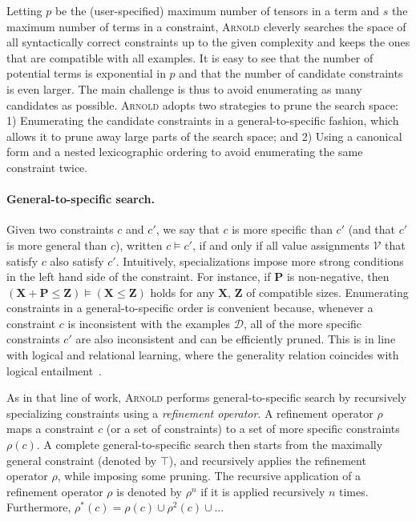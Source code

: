 \documentclass{article}
\newcommand{\luc}[1]{{\bf \textcolor{red}{{Luc: #1}}}}
\newcommand{\learner}{\textsc{Arnold}\xspace}
\newcommand{\dataset}{\ensuremath{\mathcal{D}}\xspace}
\newcommand{\variables}{\ensuremath{\mathcal{V}}\xspace}
\renewcommand\[{\begin{equation}}
\renewcommand\]{\end{equation}}
\newcommand{\TP}{\textbf{P}\xspace}
\newcommand{\TX}{\textbf{X}\xspace}
\newcommand{\TZ}{\textbf{Z}\xspace}
\begin{document}
Letting $p$ be the (user-specified) maximum number of tensors in a term and $s$
the maximum number of terms in a constraint, \learner cleverly searches the
space of all syntactically correct constraints up to the given complexity and
keeps the ones that are compatible with all examples.  It is easy to see that
the number of potential terms is exponential in $p$ and that the number of
candidate constraints is even larger.  The main challenge is thus to avoid
enumerating as many candidates as possible.
%
\learner adopts two strategies to prune the search space:
%
1) Enumerating the candidate constraints in a general-to-specific fashion,
which allows it to prune away large parts of the search space; and
%
2) Using a canonical form and a nested lexicographic ordering to avoid enumerating
the same constraint twice.
%



\paragraph{General-to-specific search.} Given two constraints $c$ and $c'$, we
say that $c$ is more specific than $c'$ (and that $c'$ is more general than
$c$), written $c \models c'$, if and only if all value assignments \variables
that satisfy $c$ also satisfy $c'$.  Intuitively, specializations impose more
strong conditions in the left hand side of the constraint.  For instance, if
$\TP$ is non-negative, then $(\TX + \TP \le \TZ) \models (\TX \le \TZ)$ holds
for any $\TX$, $\TZ$ of compatible sizes.
%
Enumerating constraints in a general-to-specific order is convenient because,
whenever a constraint $c$ is inconsistent with the examples \dataset, all of
the more specific constraints $c'$ are also inconsistent and can be efficiently
pruned.
%
This is in line with logical and relational learning, where the generality
relation coincides with logical entailment~\cite{de2008logical}.

As in that line of work, \learner performs general-to-specific search by
recursively specializing constraints using a \emph{refinement operator}.  A
refinement operator $\rho$ maps a constraint $c$ (or a set of constraints) to a
set of more specific constraints $\rho(c)$.  A complete general-to-specific
search then starts from the maximally general
constraint (denoted by $\top$), and recursively applies the refinement operator
$\rho$, while imposing some pruning.%
The recursive application of a refinement
operator $\rho$ is denoted by $\rho^n$ if it is applied recursively $n$ times.
Furthermore, $\rho^*(c) = \rho(c) \cup \rho^2(c) \cup \ldots$
\end{document}

